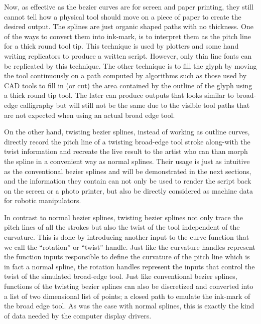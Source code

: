     Now, as effective as the bezier curves are for screen and paper printing, they still cannot tell how a physical tool should move on a piece of paper to create the desired output. The splines are just organic shaped paths with no thickness. One of the ways to convert them into ink-mark, is to interpret them as the pitch line for a thick round tool tip. This technique is used by plotters and some hand writing replicators to produce a written script. However, only thin line fonts can be replicated by this technique. The other technique is to fill the glyph by moving the tool continuously on a path computed by algorithms such as those used by CAD tools to fill in (or cut) the area contained by the outline of the glyph using a thick round tip tool. The later can produce outputs that looks similar to broad-edge calligraphy but will still not be the same due to the visible tool paths that are not expected when using an actual broad edge tool.


    On the other hand, twisting bezier splines, instead of working as outline curves, directly record the pitch line of a twisting broad-edge tool stroke along-with the twist information and recreate the live result to the artist who can than morph the spline in a convenient way as normal splines. Their usage is just as intuitive as the conventional bezier splines and will be demonstrated in the next sections, and the information they contain can not only be used to render the script back on the screen or a photo printer, but also be directly considered as machine data for robotic manipulators.

    In contrast to normal bezier splines, twisting bezier splines not only trace the pitch lines of all the strokes but also the twist of the tool independent of the curvature. This is done by introducing another input to the curve function that we call the ``rotation'' or ``twist'' handle. Just like the curvature handles represent the function inputs responsible to define the curvature of the pitch line which is in fact a normal spline, the rotation handles represent the inputs that control the twist of the simulated broad-edge tool. Just like conventional bezier splines, functions of the twisting bezier splines can also be discretized and converted into a list of two dimensional list of points; a closed path to emulate the ink-mark of the broad edge tool. As was the case with normal splines, this is exactly the kind of data needed by the computer display drivers.

